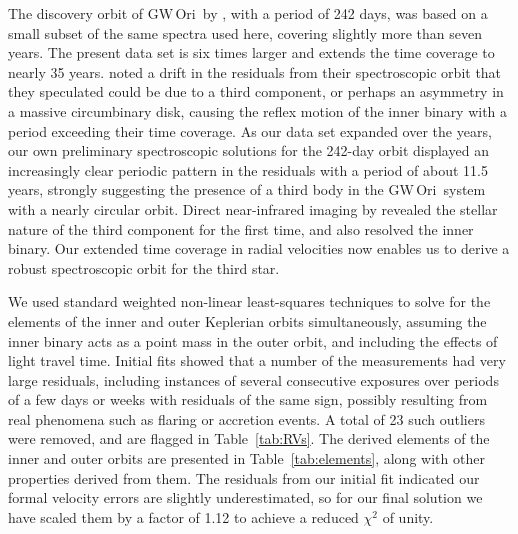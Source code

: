 \documentclass[twocolumn]{aastex6}
\newcommand{\gw}{GW\,Ori}
\begin{document}
The discovery orbit of \gw\ by \cite{mathieu91}, with a period of
242 days, was based on a small subset of the same spectra used here,
covering slightly more than seven years. The present data set is six
times larger and extends the time coverage to nearly 35 years.
\cite{mathieu91} noted a drift in the residuals from their
spectroscopic orbit that they speculated could be due to a third
component, or perhaps an asymmetry in a massive circumbinary disk,
causing the reflex motion of the inner binary with a period exceeding
their time coverage. As our data set expanded over the years, our own
preliminary spectroscopic solutions for the 242-day orbit displayed an
increasingly clear periodic pattern in the residuals with a period of
about 11.5 years, strongly suggesting the presence of a third body in
the \gw\ system with a nearly circular orbit. Direct near-infrared
imaging by \cite{Berger2011} revealed the stellar nature of the third
component for the first time, and also resolved the inner binary.  Our
extended time coverage in radial velocities now enables us to derive a
robust spectroscopic orbit for the third star.

We used standard weighted non-linear least-squares techniques
\citep[e.g.,][]{Press1992} to solve for the elements of the inner and
outer Keplerian orbits simultaneously, assuming the inner binary acts
as a point mass in the outer orbit, and including the effects of light
travel time. Initial fits showed that a number of the measurements had
very large residuals, including instances of several consecutive
exposures over periods of a few days or weeks with residuals of the
same sign, possibly resulting from real phenomena such as flaring or
accretion events. A total of 23 such outliers were removed, and are
flagged in Table~\ref{tab:RVs}. The derived elements of the inner and
outer orbits are presented in Table~\ref{tab:elements}, along with
other properties derived from them. The residuals from our initial fit
indicated our formal velocity errors are slightly underestimated, so
for our final solution we have scaled them by a factor of 1.12 to
achieve a reduced $\chi^2$ of unity.
\end{document}
